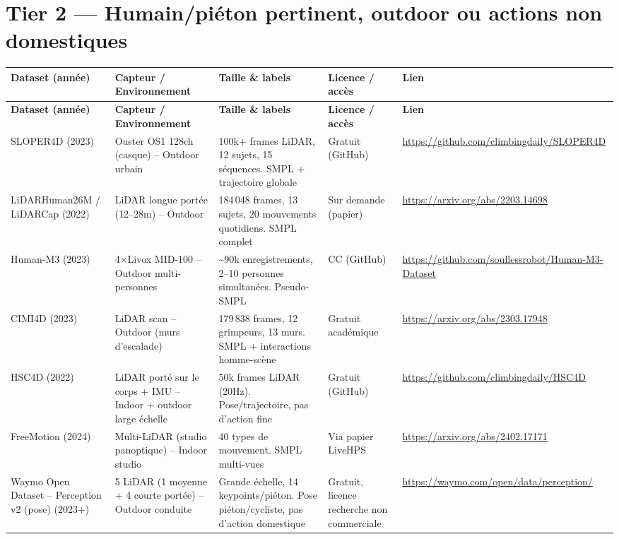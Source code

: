 \documentclass[11pt]{article}
\begin{document}
\section{Tier 2 --- Humain/piéton pertinent, outdoor ou actions non domestiques}
\label{sec:tier2}

\begin{longtable}{P{2.6cm} P{3.0cm} P{4.2cm} P{2.4cm} P{3.0cm}}
\toprule
\textbf{Dataset (année)} & \textbf{Capteur / Environnement} & \textbf{Taille \& labels} & \textbf{Licence / accès} & \textbf{Lien} \\
\midrule
\endfirsthead
\toprule
\textbf{Dataset (année)} & \textbf{Capteur / Environnement} & \textbf{Taille \& labels} & \textbf{Licence / accès} & \textbf{Lien} \\
\midrule
\endhead

SLOPER4D (2023) &
Ouster OS1 128ch (casque) -- Outdoor urbain &
100k+ frames LiDAR, 12 sujets, 15 séquences. SMPL + trajectoire globale &
Gratuit (GitHub) &
\url{https://github.com/climbingdaily/SLOPER4D} \\
\addlinespace

LiDARHuman26M / LiDARCap (2022) &
LiDAR longue portée (12--28m) -- Outdoor &
184\,048 frames, 13 sujets, 20 mouvements quotidiens. SMPL complet &
Sur demande (papier) &
\url{https://arxiv.org/abs/2203.14698} \\
\addlinespace

Human-M3 (2023) &
4$\times$Livox MID-100 -- Outdoor multi-personnes &
\textasciitilde{}90k enregistrements, 2--10 personnes simultanées. Pseudo-SMPL &
CC (GitHub) &
\url{https://github.com/soullessrobot/Human-M3-Dataset} \\
\addlinespace

CIMI4D (2023) &
LiDAR scan -- Outdoor (murs d'escalade) &
179\,838 frames, 12 grimpeurs, 13 murs. SMPL + interactions homme-scène &
Gratuit académique &
\url{https://arxiv.org/abs/2303.17948} \\
\addlinespace

HSC4D (2022) &
LiDAR porté sur le corps + IMU -- Indoor + outdoor large échelle &
50k frames LiDAR (20Hz). Pose/trajectoire, pas d'action fine &
Gratuit (GitHub) &
\url{https://github.com/climbingdaily/HSC4D} \\
\addlinespace

FreeMotion (2024) &
Multi-LiDAR (studio panoptique) -- Indoor studio &
40 types de mouvement. SMPL multi-vues &
Via papier LiveHPS &
\url{https://arxiv.org/abs/2402.17171} \\
\addlinespace

Waymo Open Dataset -- Perception v2 (pose) (2023+) &
5 LiDAR (1 moyenne + 4 courte portée) -- Outdoor conduite &
Grande échelle, 14 keypoints/piéton. Pose piéton/cycliste, pas d'action domestique &
Gratuit, licence recherche non commerciale &
\url{https://waymo.com/open/data/perception/} \\

\bottomrule
\end{longtable}
\end{document}
